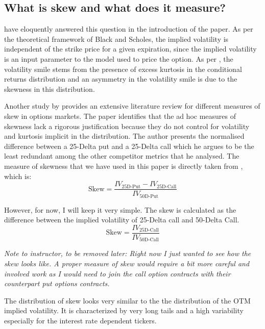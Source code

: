 \subsection{What is skew and what does it measure? }

\cite{das1998smiles} have eloquently answered this question in the introduction of the paper. As per the theoretical framework of Black and Scholes, the implied volatility is independent of the strike price for a given expiration, since the implied volatility is an input parameter to the model used to price the option. As per \cite{das1998smiles}, the volatility smile stems from the presence of excess kurtosis in the conditional returns distribution and an asymmetry in the volatility smile is due to the skewness in this distribution.

Another study by \cite{mixon2011volatility} provides an extensive literature review for different measures of skew in options markets. The paper identifies that the ad hoc measures of skewness lack a rigorous justification because they do not control for volatility and kurtosis implicit in the distribution. The author presents the normalised difference between a 25-Delta put and a 25-Delta call which he argues to be the least redundant among the other competitor metrics that he analysed. The measure of skewness that we have used in this paper is directly taken from \cite{mixon2011volatility}, which is:
$$ \text{Skew} = \frac{IV_\text{25D-Put} - IV_\text{25D-Call}}{IV_\text{50D-Put} } $$

However, for now, I will keep it very simple. The skew is calculated as the difference between the implied volatility of 25-Delta call and 50-Delta Call.
$$ \text{Skew} = \frac{IV_\text{25D-Call}} {IV_\text{50D-Call}}$$



\textit{Note to instructor, to be removed later: Right now I just wanted to see how the skew looks like. A proper measure of skew would require a bit more careful and involved work as I would need to join the call option contracts with their counterpart put options contracts.}


The distribution of skew looks very similar to the the distribution of the OTM implied volatility. It is characterized by very long tails and a high variability especially for the interest rate dependent tickers. 


